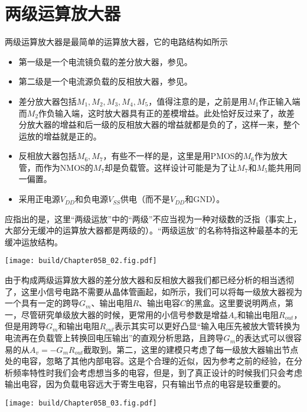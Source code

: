 \section{两级运算放大器}

两级运算放大器是最简单的运算放大器，它的电路结构如所示
\begin{itemize}
    \item 第一级是一个电流镜负载的差分放大器，参见。
    \item 第二级是一个电流源负载的反相放大器，参见。
    \item 差分放大器包括$M_1,M_2,M_3,M_4,M_5$，值得注意的是，之前是用$M_1$作正输入端而$M_2$作负输入端，这时放大器具有正的差模增益。此处恰好反过来了，故差分放大器的增益和后一级的反相放大器的增益就都是负的了，这样一来，整个运放的增益就是正的。
    \item 反相放大器包括$M_6,M_7$，有些不一样的是，这里是用PMOS的$M_6$作为放大管，而作为NMOS的$M_7$却是负载管。这样设计可能是为了让$M_7$和$M_5$能共用同一偏置。
    \item 采用正电源$V_{DD}$和负电源$V_{SS}$供电（而不是$V_{DD}$和GND）。
\end{itemize}

应指出的是，这里“两级运放”中的“两级”不应当视为一种对级数的泛指（事实上，大部分无缓冲的运算放大器都是两级的）。“两级运放”的名称特指这种最基本的无缓冲运放结构。

\begin{Figure}[两级运算放大器]
    \texttt{[image: build/Chapter05B\_02.fig.pdf]}    
\end{Figure}



由于构成两级运算放大器的差分放大器和反相放大器我们都已经分析的相当透彻了，这里小信号电路不需要从晶体管画起，如所示，我们可以将每一级放大器视为一个具有一定的跨导$G_{m}$、输出电阻$R$、输出电容$C$的黑盒。这里要说明两点，第一，尽管研究单级放大器的时候，更常用的小信号参数是增益$A_v$和输出电阻$R_{out}$，但是用跨导$G_m$和输出电阻$R_{out}$表示其实可以更好凸显“输入电压先被放大管转换为电流再在负载管上转换回电压输出”的直观分析思路，且跨导$G_m$的表达式可以很容易的从$A_v=-G_m R_{out}$截取到。第二，这里的建模只考虑了每一级放大器输出节点处的电容，忽略了其他内部电容。这是个合理的近似，因为参考之前的经验，在分析频率特性时我们会考虑想当多的电容，但是，到了真正设计的时候我们只会考虑输出电容，因为负载电容远大于寄生电容，只有输出节点的电容是较重要的。
\begin{Figure}[两级运放的小信号电路]
    \texttt{[image: build/Chapter05B\_03.fig.pdf]}
\end{Figure}

